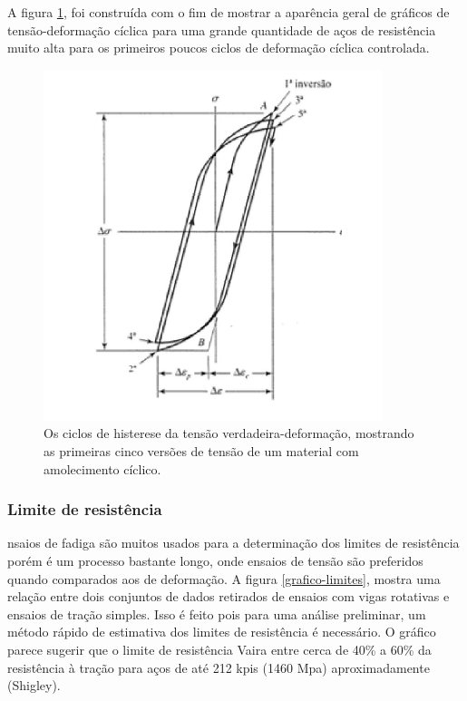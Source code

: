 	A figura \ref{histerese}, foi construída com o fim de mostrar a aparência geral de gráficos de tensão-deformação cíclica para uma grande quantidade de aços de resistência muito alta para os primeiros poucos ciclos de deformação cíclica controlada.

\begin{figure}[h]
\centering
\includegraphics[scale=0.8]{figuras/histerese.png}
\caption{Os ciclos de histerese da tensão verdadeira-deformação, mostrando as primeiras cinco versões de tensão de um material com amolecimento cíclico.}
\label{histerese}
\end{figure}

\subsubsection{Limite de resistência}

nsaios de fadiga são muitos usados para a determinação dos limites de resistência porém é um processo bastante longo, onde ensaios de tensão são preferidos quando comparados aos de deformação.
	A figura \ref{grafico-limites}, mostra uma relação entre dois conjuntos de dados retirados de ensaios com vigas rotativas e ensaios de tração simples. Isso é feito pois para uma análise preliminar, um método rápido de estimativa dos limites de resistência é necessário. O gráfico parece sugerir que o limite de resistência Vaira entre cerca de 40\% a 60\% da resistência à tração para aços de até 212 kpis (1460 Mpa) aproximadamente (Shigley).
	
